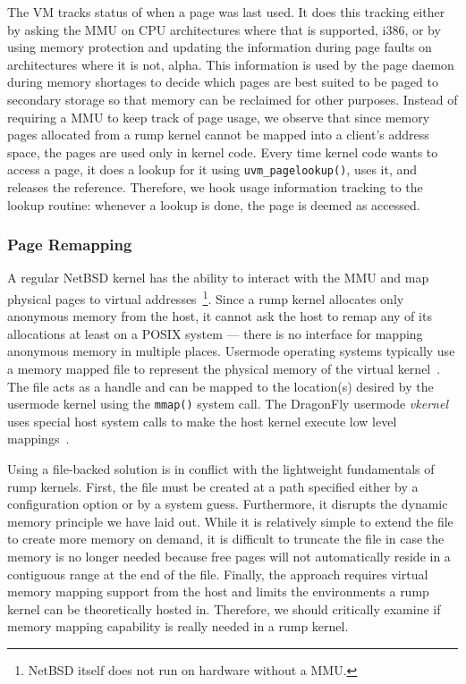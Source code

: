 The VM tracks status of when a page was last used.  It does this tracking
either by asking the MMU on CPU architectures where that is supported,
\eg i386,
or by using memory protection and updating the information during
page faults on architectures where it is not, \eg alpha.  This information is
used by the page daemon during memory shortages to decide which
pages are best suited to be paged to secondary storage so that
memory can be reclaimed for other purposes.  Instead of requiring
a MMU to keep track of page usage, we observe that since memory
pages allocated from a rump kernel cannot be mapped into a client's
address space, the pages are used only in kernel code.  Every time
kernel code wants to access a page, it does a lookup for it using
\verb+uvm_pagelookup()+, uses it, and releases the reference.
Therefore, we hook usage information tracking to the lookup routine:
whenever a lookup is done, the page is deemed as accessed.

\subsubsection{Page Remapping}

A regular NetBSD kernel has the ability to interact with the MMU and
map physical pages to virtual addresses~\footnote
{
	NetBSD itself does not run on hardware without a MMU.
}.
Since a rump kernel allocates only anonymous memory from the host,
it cannot ask the host to remap any of its allocations at least on
a POSIX system --- there is no interface for mapping anonymous memory
in multiple places.  Usermode operating systems typically use a
memory mapped file to represent the physical memory of the virtual
kernel~\cite{dike:uml,eco:vkernel}.  The file acts as a handle and
can be mapped to the location(s) desired by the usermode kernel
using the \texttt{mmap()} system call.  The DragonFly usermode
\textit{vkernel} uses special host system calls to make the host kernel
execute low level mappings~\cite{eco:vkernel}.

Using a file-backed solution is in conflict with the lightweight
fundamentals of rump kernels.  First, the file must be created at
a path specified either by a configuration option or by a system
guess.  Furthermore, it disrupts the dynamic memory principle we
have laid out.  While it is relatively simple to extend the file
to create more memory on demand, it is difficult to
truncate the file in case the memory is no longer needed
because free pages will not automatically reside in a contiguous
range at the end of the file.  Finally, the approach requires
virtual memory mapping support from the host and limits the
environments a rump kernel can be theoretically hosted in.  Therefore,
we should critically examine if memory mapping capability is really
needed in a rump kernel.

